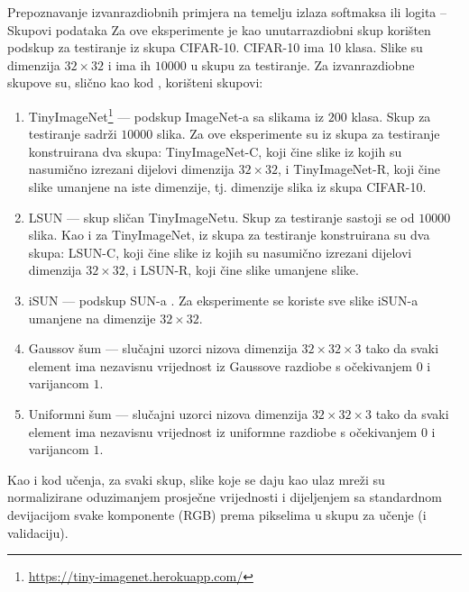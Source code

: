 \documentclass{beamer}
\begin{document}
\begin{frame}[allowframebreaks=0.9]{Prepoznavanje izvanrazdiobnih primjera na temelju izlaza softmaksa ili logita -- Skupovi podataka}
Za ove eksperimente je kao unutarrazdiobni skup korišten podskup za testiranje iz skupa CIFAR-10. CIFAR-10 ima 10 klasa. Slike su dimenzija $32\times 32$ i ima ih $10000$ u skupu za testiranje. Za izvanrazdiobne skupove su, slično kao kod \citet{Hendrycks:2016:BDMOODE,Liang:2017:PDOODENN}, korišteni skupovi:
\begin{enumerate}
	\item TinyImageNet\footnote{\url{https://tiny-imagenet.herokuapp.com/}} --- podskup ImageNet-a \citep{Deng:2009:ILSHID} sa slikama iz $200$ klasa. Skup za testiranje sadrži $10000$ slika. Za ove eksperimente su iz skupa za testiranje konstruirana dva skupa: TinyImageNet-C, koji čine slike iz kojih su nasumično izrezani dijelovi dimenzija $32\times 32$, i TinyImageNet-R, koji čine slike umanjene na iste dimenzije, tj. dimenzije slika iz skupa CIFAR-10.
	\item LSUN \citep{Yu:2015:LSUN} --- skup sličan TinyImageNetu. Skup za testiranje sastoji se od $10000$ slika. Kao i za TinyImageNet, iz skupa za testiranje konstruirana su dva skupa: LSUN-C, koji čine slike iz kojih su nasumično izrezani dijelovi dimenzija $32\times 32$, i LSUN-R, koji čine slike umanjene slike.
	\item iSUN \citep{Xu:2015:TCSWBET} --- podskup SUN-a \citep{Xiao:2016:SUN}. Za eksperimente se koriste sve slike iSUN-a umanjene na dimenzije $32\times 32$.
	\item Gaussov šum --- slučajni uzorci nizova dimenzija $32\times 32\times 3$ tako da svaki element ima nezavisnu vrijednost iz Gaussove razdiobe s očekivanjem $0$ i varijancom $1$.
	\item Uniformni šum --- slučajni uzorci nizova dimenzija $32\times 32\times 3$ tako da svaki element ima nezavisnu vrijednost iz uniformne razdiobe s očekivanjem $0$ i varijancom $1$.
\end{enumerate}
Kao i kod učenja, za svaki skup, slike koje se daju kao ulaz mreži su normalizirane oduzimanjem prosječne vrijednosti i dijeljenjem sa standardnom devijacijom svake komponente (RGB) prema pikselima u skupu za učenje (i validaciju).
\end{frame}
\end{document}
